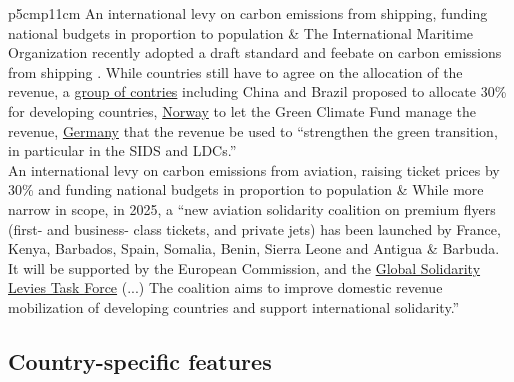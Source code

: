 \begin{table}[H]
\begin{tabular}{p{5cm}p{11cm}}
An international levy on carbon emissions from shipping, funding national budgets in proportion to population & The International Maritime Organization recently adopted a draft standard and feebate on carbon emissions from shipping \citep{imo_draft_2025}. While countries still have to agree on the allocation of the revenue, a \href{https://wwwcdn.imo.org/localresources/en/OurWork/Environment/Documents/Expert%20workshop/MEPC%2080-INF.39-Add.1%20-%20Report%20of%20the%20ad-hoc%20Expert%20Workshop%20on%20comparative%20analysisof%20candidate%20mid-term%20GHG%20redu...%20%28Secretariat%29.pdf}{group of contries} including China and Brazil proposed to allocate 30\% for developing countries, \href{https://wwwcdn.imo.org/localresources/en/OurWork/Environment/Documents/Expert%20workshop/Factsheets/GHG-EW%203-INF.2%20-%20Factsheet%20On%20Emission%20Cap-And-Trade%20System%20(Norway)%20(4).pdf}{Norway} to let the Green Climate Fund manage the revenue, \href{https://wwwcdn.imo.org/localresources/en/OurWork/Environment/Documents/Expert%20workshop/Factsheets/GHG-EW%203-INF.4%20-%20Factsheet%20On%20Combination%20Of%20The%20Ghg%20Fuel%20Standard%20With%20A%20Levy%20(Denmark)%20(4).pdf}{Germany} that the revenue be used to ``strengthen the green transition, in particular in the SIDS and LDCs.'' \\ \addlinespace 
An international levy on carbon emissions from aviation, raising ticket prices by 30\% and funding national budgets in proportion to population & While more narrow in scope, in 2025, a ``new aviation solidarity coalition on premium flyers (first- and business- class tickets, and private jets) has been launched by France, Kenya, Barbados, Spain, Somalia, Benin, Sierra Leone and Antigua \& Barbuda. It will be supported by the European Commission, and the \href{https://solidaritylevies.org/eight-countries-launch-solidarity-coalition-for-levies-on-premium-flyers/}{Global Solidarity Levies Task Force} (...) The coalition aims to improve domestic revenue mobilization of developing countries and support international solidarity.'' \\ \addlinespace 
\bottomrule
\end{tabular}
\end{table}

\subsection{Country-specific features}\label{subsec:country_features}

